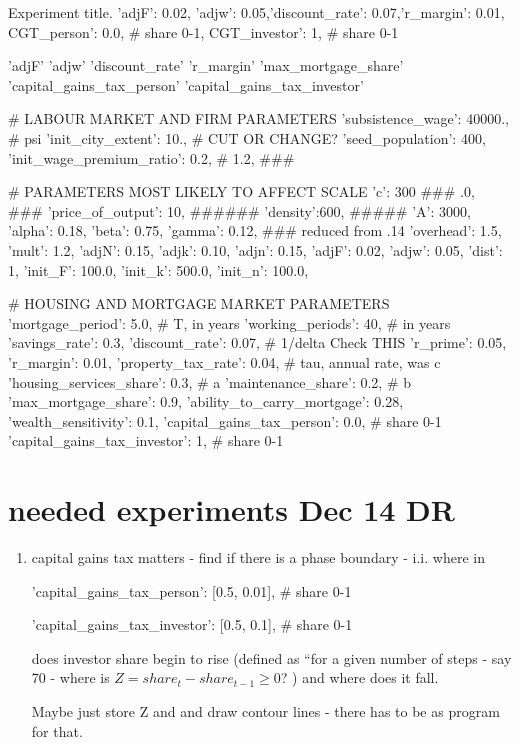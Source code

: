 Experiment title. 'adjF': 0.02, 'adjw': 0.05,'discount_rate': 0.07,'r_margin': 0.01, CGT_person':   0.0, # share 0-1,  CGT_investor': 1, # share 0-1

'adjF'
'adjw'
'discount_rate'
'r_margin'
'max_mortgage_share'
'capital_gains_tax_person'
'capital_gains_tax_investor'


        # LABOUR MARKET AND FIRM PARAMETERS
            'subsistence_wage': 40000., # psi
            'init_city_extent': 10.,    # CUT OR CHANGE?
            'seed_population': 400,
            'init_wage_premium_ratio': 0.2, # 1.2, ###

            # PARAMETERS MOST LIKELY TO AFFECT SCALE
            'c': 300                             ### .0,                            ###
            'price_of_output': 10,                 ######
            'density':600,                         #####
            'A': 3000,
            'alpha': 0.18,
            'beta':  0.75,
            'gamma': 0.12, ### reduced from .14
            'overhead': 1.5,
            'mult': 1.2,
            'adjN': 0.15,
            'adjk': 0.10,
            'adjn': 0.15,
'adjF': 0.02,
'adjw': 0.05, 
            'dist': 1, 
            'init_F': 100.0,
            'init_k': 500.0,
            'init_n': 100.0,

            # HOUSING AND MORTGAGE MARKET PARAMETERS
            'mortgage_period': 5.0,       # T, in years
            'working_periods': 40,        # in years
            'savings_rate': 0.3,
'discount_rate': 0.07,        # 1/delta    Check THIS
            'r_prime': 0.05,
'r_margin': 0.01,
            'property_tax_rate': 0.04,     # tau, annual rate, was c
            'housing_services_share': 0.3, # a
            'maintenance_share': 0.2,      # b
'max_mortgage_share': 0.9,
            'ability_to_carry_mortgage': 0.28,
            'wealth_sensitivity': 0.1,
'capital_gains_tax_person':   0.0, # share 0-1
'capital_gains_tax_investor': 1, # share 0-1
 

\section{needed experiments Dec 14 DR}
\begin{enumerate}
    \item capital gains tax matters - find if there is a phase boundary - i.i. where in 

            'capital_gains_tax_person': [0.5, 0.01], # share 0-1

            'capital_gains_tax_investor': [0.5, 0.1], # share 0-1

            does investor share begin to rise (defined as ``for a given number of steps - say 70 - where is $Z=share_t - share_{t-1} \ge 0$? ) and where does it fall.

Maybe just store Z and and draw contour lines - there has to be as program for that.
\end{enumerate}
